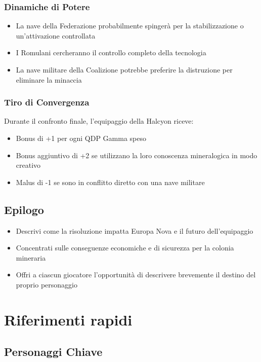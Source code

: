 \documentclass[letterpaper,twocolumn,openany,nodeprecatedcode]{dndbook}
\begin{document}
\subsubsection{Dinamiche di Potere}

\begin{itemize}
    \item La nave della Federazione probabilmente spingerà per la stabilizzazione o un'attivazione controllata
    \item I Romulani cercheranno il controllo completo della tecnologia
    \item La nave militare della Coalizione potrebbe preferire la distruzione per eliminare la minaccia
\end{itemize}

\subsubsection{Tiro di Convergenza}
Durante il confronto finale, l'equipaggio della Halcyon riceve:

\begin{itemize}
    \item Bonus di +1 per ogni QDP Gamma speso
    \item Bonus aggiuntivo di +2 se utilizzano la loro conoscenza mineralogica in modo creativo
    \item Malus di -1 se sono in conflitto diretto con una nave militare
\end{itemize}

\subsection{Epilogo}

\begin{itemize}
    \item Descrivi come la risoluzione impatta Europa Nova e il futuro dell'equipaggio
    \item Concentrati sulle conseguenze economiche e di sicurezza per la colonia mineraria
    \item Offri a ciascun giocatore l'opportunità di descrivere brevemente il destino del proprio personaggio
\end{itemize}




\section{Riferimenti rapidi}
\subsection{Personaggi Chiave}
\end{document}
